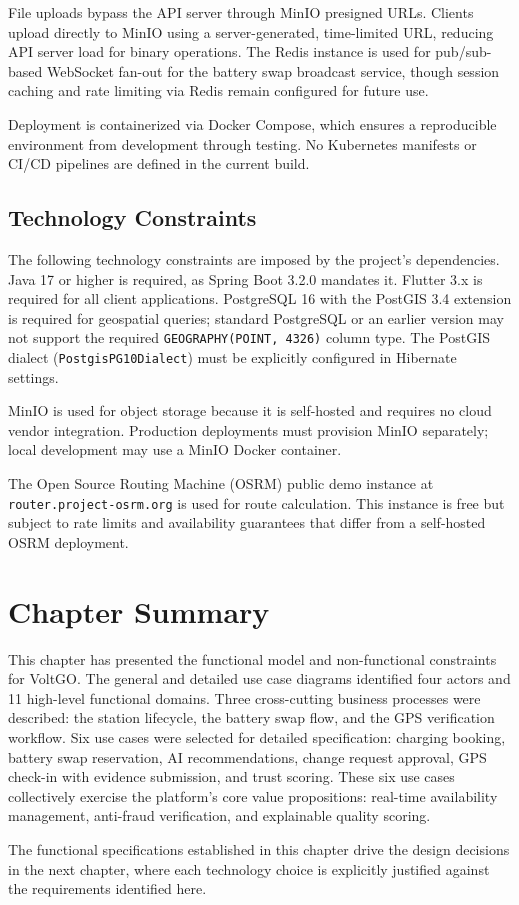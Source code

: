 \documentclass[../Main.tex]{subfiles}
\begin{document}
File uploads bypass the API server through MinIO presigned URLs. Clients upload directly to MinIO using a server-generated, time-limited URL, reducing API server load for binary operations. The Redis instance is used for pub/sub-based WebSocket fan-out for the battery swap broadcast service, though session caching and rate limiting via Redis remain configured for future use.

Deployment is containerized via Docker Compose, which ensures a reproducible environment from development through testing. No Kubernetes manifests or CI/CD pipelines are defined in the current build.

\subsection{Technology Constraints}
\label{subsection:2.4.4}
The following technology constraints are imposed by the project's dependencies. Java 17 or higher is required, as Spring Boot 3.2.0 mandates it. Flutter 3.x is required for all client applications. PostgreSQL 16 with the PostGIS 3.4 extension is required for geospatial queries; standard PostgreSQL or an earlier version may not support the required \verb|GEOGRAPHY(POINT, 4326)| column type. The PostGIS dialect (\verb|PostgisPG10Dialect|) must be explicitly configured in Hibernate settings.

MinIO is used for object storage because it is self-hosted and requires no cloud vendor integration. Production deployments must provision MinIO separately; local development may use a MinIO Docker container.

The Open Source Routing Machine (OSRM) public demo instance at \verb|router.project-osrm.org| is used for route calculation. This instance is free but subject to rate limits and availability guarantees that differ from a self-hosted OSRM deployment.

\section*{Chapter Summary}
This chapter has presented the functional model and non-functional constraints for VoltGO. The general and detailed use case diagrams identified four actors and 11 high-level functional domains. Three cross-cutting business processes were described: the station lifecycle, the battery swap flow, and the GPS verification workflow. Six use cases were selected for detailed specification: charging booking, battery swap reservation, AI recommendations, change request approval, GPS check-in with evidence submission, and trust scoring. These six use cases collectively exercise the platform's core value propositions: real-time availability management, anti-fraud verification, and explainable quality scoring.

The functional specifications established in this chapter drive the design decisions in the next chapter, where each technology choice is explicitly justified against the requirements identified here.


\end{document}
